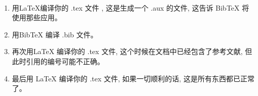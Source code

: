 \documentclass{ctexart}
\begin{document}
    \paragraph{} 
    \begin{enumerate}
 \item 用LaTeX编译你的 .tex 文件 , 这是生成一个 .aux 的文件, 这告诉 BibTeX 将使用那些应用。
 \item 用BibTeX 编译 .bib 文件。
 \item 再次用LaTeX 编译你的 .tex 文件, 这个时候在文档中已经包含了参考文献, 但此时引用的编号可能不正确。
 \item 最后用 LaTeX 编译你的 .tex 文件, 如果一切顺利的话, 这是所有东西都已正常了。\cite{Latex中如何制作参考文献}
    \end{enumerate}
    
    
    
\end{document}
